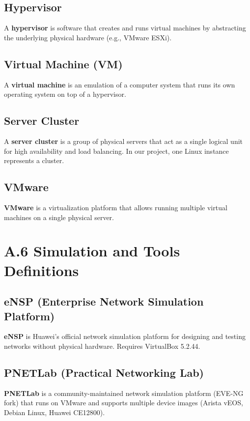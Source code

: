 \subsection*{Hypervisor}
\label{def:hypervisor}
A \textbf{hypervisor} is software that creates and runs virtual machines by 
abstracting the underlying physical hardware (e.g., VMware ESXi).

\subsection*{Virtual Machine (VM)}
\label{def:vm}
A \textbf{virtual machine} is an emulation of a computer system that runs its 
own operating system on top of a hypervisor.

\subsection*{Server Cluster}
\label{def:servercluster}
A \textbf{server cluster} is a group of physical servers that act as a single 
logical unit for high availability and load balancing. In our project, one 
Linux instance represents a cluster.

\subsection*{VMware}
\label{def:vmware}
\textbf{VMware} is a virtualization platform that allows running multiple 
virtual machines on a single physical server.

\section*{A.6 Simulation and Tools Definitions}

\subsection*{eNSP (Enterprise Network Simulation Platform)}
\label{def:ensp}
\textbf{eNSP} is Huawei's official network simulation platform for designing 
and testing networks without physical hardware. Requires VirtualBox 5.2.44.

\subsection*{PNETLab (Practical Networking Lab)}
\label{def:pnetlab}
\textbf{PNETLab} is a community-maintained network simulation platform 
(EVE-NG fork) that runs on VMware and supports multiple device images 
(Arista vEOS, Debian Linux, Huawei CE12800).

